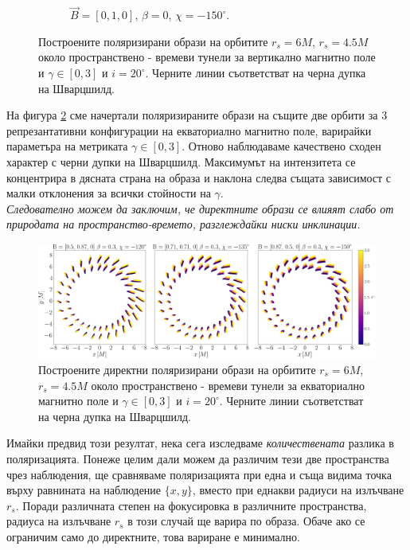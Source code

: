 \begin{figure}[!htb]
\begin{subfigure}{8cm}
		\caption{$\vec{B} = [0, 1, 0]$, $\beta = 0$, $\chi = -150^\circ$.}
	\end{subfigure}
	\caption[Поляризирани образи около пространствено - времеви тунели за вертикално магнитно поле.]{\small Построените поляризирани образи на орбитите $r_s = 6M$, $r_s = 4.5M$ около пространствено - времеви тунели за вертикално магнитно поле и $\gamma \in[0,3]$ и $i = 20^\circ$. Черните линии съответстват на черна дупка на Шварцшилд.} 
	\label{WH_pol_vert_field}
\end{figure}

На фигура \ref{WH_pol_eq_field} сме начертали поляризираните образи на същите две орбити за 3 репрезантативни конфигурации на екваториално магнитно поле, варирайки параметъра на метриката $\gamma \in[0,3]$. Отново наблюдаваме качествено сходен характер с черни дупки на Шварцшилд. Максимумът на интензитета се концентрира в дясната страна на образа и наклона следва същата зависимост с малки отклонения за всички стойности на $\gamma$. \\

\emph{Следователно можем да заключим, че директните образи се влияят слабо от природата на пространство-времето, разглеждайки ниски инклинации.}

\begin{figure}[!htb]
	\centering
	\includegraphics[scale = 0.2]{WH_alpha_Eq_Field.png}
	\caption[Поляризирани директни образи около пространствено - времеви тунели за екваториално магнитно поле.]{\small Построените директни поляризирани образи на орбитите $r_s = 6M$, $r_s = 4.5M$ около пространствено - времеви тунели за екваториално магнитно поле и $\gamma \in[0,3]$ и $i = 20^\circ$. Черните линии съответстват на черна дупка на Шварцшилд.} 
	\label{WH_pol_eq_field}
\end{figure}

\newpage

Имайки предвид този резултат, нека сега изследваме \emph{количествената} разлика в поляризацията. Понеже целим дали можем да различим тези две пространства чрез наблюдения, ще сравняваме поляризацията при една и съща видима точка върху равнината на наблюдение $\{x,y\}$, вместо при еднакви радиуси на излъчване $r_s$. Поради различната степен на фокусировка в различните пространства, радиуса на излъчване $r_s$ в този случай ще варира по образа. Обаче ако се ограничим само до директните, това вариране е минимално.\\

